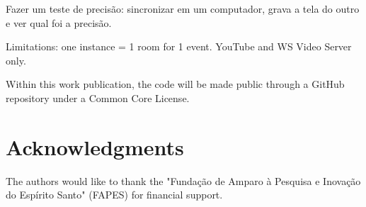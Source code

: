 \documentclass{sig-alternate-05-2015}
\begin{document}
Fazer um teste de precisão: sincronizar em um computador, grava a tela do outro e ver qual foi a precisão.

Limitations: one instance = 1 room for 1 event. YouTube and WS Video Server only.

Within this work publication, the code will be made public through a GitHub repository under a Common Core License.

\section{Acknowledgments}
The authors would like to thank the "Fundação de Amparo à Pesquisa e Inovação do Espírito Santo" (FAPES) for financial support.


  
\end{document}
